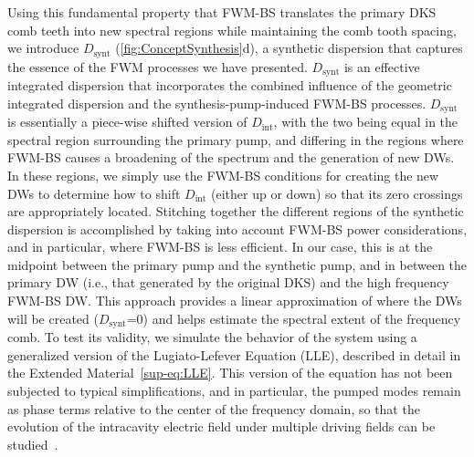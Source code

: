 \documentclass[reprint,superscriptaddress, amsmath,amssymb,pra, aps,floatfix,longbibliography]{revtex4-1}
\begin{document}
Using this fundamental property that FWM-BS translates the primary DKS comb teeth into new spectral regions while maintaining the comb tooth spacing, we introduce $D_\mathrm{synt}$ (\cref{fig:ConceptSynthesis}d), a synthetic dispersion that captures the essence of the FWM processes we have presented. $D_\mathrm{synt}$ is an effective integrated dispersion that incorporates the combined influence of the geometric integrated dispersion and the synthesis-pump-induced FWM-BS processes. $D_\mathrm{synt}$ is essentially a piece-wise shifted version of $D_\text{int}$, with the two being equal in the spectral region surrounding the primary pump, and differing in the regions where FWM-BS causes a broadening of the spectrum and the generation of new DWs. In these regions, we simply use the FWM-BS conditions for creating the new DWs to determine how to shift $D_\text{int}$ (either up or down) so that its zero crossings are appropriately located. Stitching together the different regions of the synthetic dispersion is accomplished by taking into account FWM-BS power considerations, and in particular, where FWM-BS is less efficient. In our case, this is at the midpoint between the primary pump and the synthetic pump, and in between the primary DW (i.e., that generated by the original DKS) and the high frequency FWM-BS DW. This approach provides a linear approximation of where the DWs will be created ($D_\mathrm{synt}$=0) and helps estimate the spectral extent of the frequency comb. To test its validity, we simulate the behavior of the system using a generalized version of the Lugiato-Lefever Equation (LLE), described in detail in the Extended Material~\cref{sup-eq:LLE}. This version of the equation has not been subjected to typical simplifications, and in particular, the pumped modes remain as phase terms relative to the center of the frequency domain, so that the evolution of the intracavity electric field under multiple driving fields can be studied~\cite{taheri_optical_2017}.

%
%
%
\end{document}
